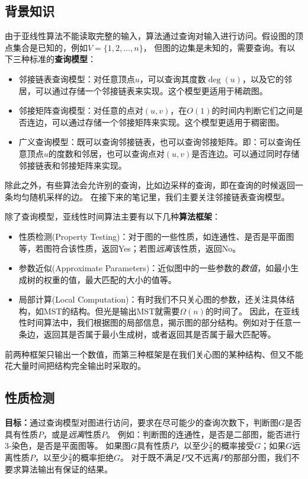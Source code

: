 \documentclass[lang=cn,newtx,10pt,scheme=chinese,chinesefont=nofont,citestyle=gb7714-2015, bibstyle=gb7714-2015]{elegantbook}
\begin{document}
\begin{refsection}
\subsection{背景知识}
由于亚线性算法不能读取完整的输入，算法通过查询对输入进行访问。假设图的顶点集合是已知的，例如$V=\{1,2,\dots,n\}$，
但图的边集是未知的，需要查询。有以下三种标准的\textbf{查询模型}：
\begin{itemize}
    \item 邻接链表查询模型：对任意顶点$u$，可以查询其度数$\deg(u)$，以及它的邻居，可以通过存储一个邻接链表来实现。这个模型更适用于稀疏图。
    \item 邻接矩阵查询模型：对任意的点对$(u,v)$，在$O(1)$的时间内判断它们之间是否连边，可以通过存储一个邻接矩阵来实现。这个模型更适用于稠密图。
    \item 广义查询模型：既可以查询邻接链表，也可以查询邻接矩阵。即：可以查询任意顶点$u$的度数和邻居，也可以查询点对$(u,v)$是否连边。可以通过同时存储邻接链表和邻接矩阵来实现。
\end{itemize}

除此之外，有些算法会允许别的查询，比如边采样的查询，即在查询的时候返回一条均匀随机采样的边。
在接下来的笔记里，我们主要关注邻接链表查询模型。

除了查询模型，亚线性时间算法主要有以下几种\textbf{算法框架}：
\begin{itemize}
    \item 性质检测(Property Testing)：对于图的一些性质，如连通性、是否是平面图等，若图符合该性质，返回Yes；若图\textit{远离}该性质，返回No。
    \item 参数近似(Approximate Parameters)：近似图中的一些参数的\textit{数值}，如最小生成树的权重的值，最大匹配的大小的值等。
    \item 局部计算(Local Computation)：有时我们不只关心图的参数，还关注具体结构，如MST的结构。但光是输出MST就需要$\Omega(n)$的时间了。
    因此，在亚线性时间算法中，我们根据图的局部信息，揭示图的部分结构。例如对于任意一条边，返回其是否属于最小生成树，或者返回其是否属于最大匹配等。
\end{itemize}

前两种框架只输出一个数值，而第三种框架是在我们关心图的某种结构、但又不能花大量时间把结构完全输出时采取的。


\subsection{性质检测}
\textbf{目标：}通过查询模型对图进行访问，要求在尽可能少的查询次数下，判断图$G$是否具有性质$P$，或是\textit{远离}性质$P$。
例如：判断图的连通性，是否是二部图，能否进行3-染色，是否是平面图等。
如果图$G$具有性质$P$，以至少$\frac{2}{3}$的概率接受$G$；如果$G$远离性质$P$，以至少$\frac{2}{3}$的概率拒绝$G$。
对于既不满足$P$又不远离$P$的那部分图，我们不要求算法输出有保证的结果。


\end{refsection}
\end{document}
